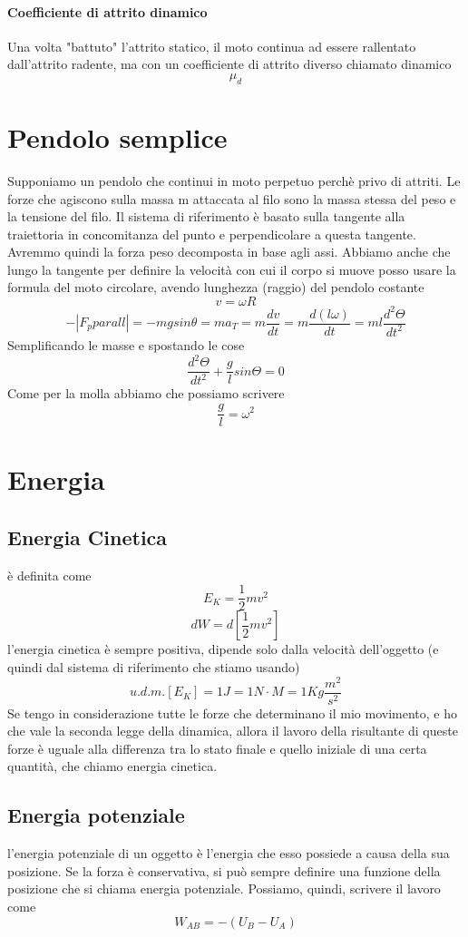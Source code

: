 \documentclass[a4paper]{report}
\begin{document}
  \paragraph{Coefficiente di attrito dinamico}
  Una volta "battuto" l'attrito statico, il moto continua ad essere rallentato dall'attrito radente, ma con un coefficiente di attrito diverso chiamato dinamico
  $$ \mu_d $$


  \section{Pendolo semplice}
  Supponiamo un pendolo che continui in moto perpetuo perchè privo di attriti. Le forze che agiscono sulla massa m attaccata al filo sono la massa stessa del peso e la tensione del filo. Il sistema di riferimento è basato sulla tangente alla traiettoria in concomitanza del punto e perpendicolare a questa tangente. Avremmo quindi la forza peso decomposta in base agli assi.
  Abbiamo anche che lungo la tangente per definire la velocità con cui il corpo si muove posso usare la formula del moto circolare, avendo lunghezza (raggio) del pendolo costante
  $$ v = \omega R$$
  $$- |F_pparall| = - mg sin \theta = m a_T = m \frac{dv}{dt} = m \frac{d(l\omega)}{dt} = ml \frac{d^2 \Theta}{dt^2}$$
  Semplificando le masse e spostando le cose
  $$ \frac{d^2\Theta}{dt^2} + \frac{g}{l} sin \Theta = 0 $$
  Come per la molla abbiamo che possiamo scrivere
  $$ \frac{g}{l} = \omega^2$$

  \section{Energia}
  \subsection{Energia Cinetica}
  è definita come
  $$ E_K = \frac{1}{2}m v^2 $$
  $$ dW = d[\frac{1}{2}m v^2] $$
  l'energia cinetica è sempre positiva, dipende solo dalla velocità dell'oggetto (e quindi dal sistema di riferimento che stiamo usando)
  $$ u.d.m.[E_K]= 1J = 1N\cdot M = 1 Kg \frac{m^2}{s^2}$$
  Se tengo in considerazione tutte le forze che determinano il mio movimento, e ho che vale la seconda legge della dinamica, allora il lavoro della risultante di queste forze è uguale alla differenza tra lo stato finale e quello iniziale di una certa quantità, che chiamo energia cinetica.

  \subsection{Energia potenziale}
   l'energia potenziale di un oggetto è l'energia che esso possiede a causa della sua posizione.
   Se la forza è conservativa, si può sempre definire una funzione della posizione che si chiama energia potenziale.
   Possiamo, quindi, scrivere il lavoro come
  $$ W_{AB} = -(U_B - U_A) $$
\end{document}
